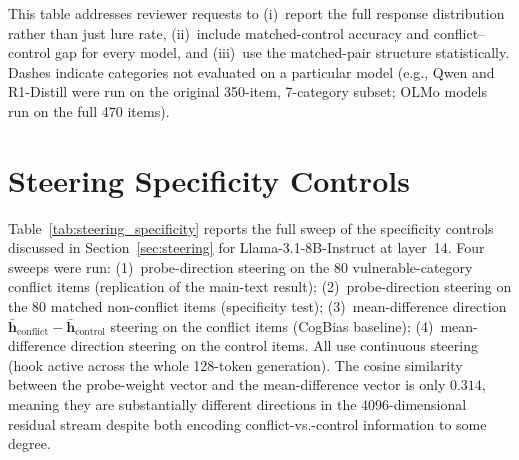 \documentclass{article}
\begin{document}
This table addresses reviewer requests to (i)~report the full response
distribution rather than just lure rate, (ii)~include matched-control
accuracy and conflict--control gap for every model, and (iii)~use the
matched-pair structure statistically.  Dashes indicate categories not
evaluated on a particular model (e.g., Qwen and R1-Distill were run
on the original 350-item, 7-category subset; OLMo models run on the
full 470 items).



\section{Steering Specificity Controls}
\label{app:steering_specificity}

Table~\ref{tab:steering_specificity} reports the full sweep of the
specificity controls discussed in Section~\ref{sec:steering} for
Llama-3.1-8B-Instruct at layer~14.  Four sweeps were run:
(1)~probe-direction steering on the 80 vulnerable-category conflict
items (replication of the main-text result); (2)~probe-direction
steering on the 80 matched non-conflict items (specificity test);
(3)~mean-difference direction $\bar{\mathbf{h}}_{\text{conflict}} - \bar{\mathbf{h}}_{\text{control}}$
steering on the conflict items (CogBias baseline); (4)~mean-difference
direction steering on the control items.  All use continuous steering
(hook active across the whole 128-token generation).  The cosine
similarity between the probe-weight vector and the mean-difference
vector is only $0.314$, meaning they are substantially different
directions in the 4096-dimensional residual stream despite both
encoding conflict-vs.-control information to some degree.
\end{document}
